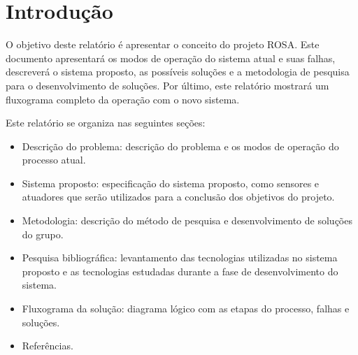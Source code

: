 


\section{Introdução}
O objetivo deste relatório é apresentar o conceito do projeto ROSA. Este
documento apresentará os modos de operação do sistema atual e suas falhas,
descreverá o sistema proposto, as possíveis soluções e a metodologia de pesquisa
para o desenvolvimento de soluções. Por último, este relatório mostrará um
fluxograma completo da operação com o novo sistema.

Este relatório se organiza nas seguintes seções:
    \begin{itemize}
        \item Descrição do problema: descrição do problema e os modos de operação do processo atual.
        \item Sistema proposto: especificação do sistema proposto, como sensores e atuadores que serão utilizados para a conclusão dos objetivos do projeto.
        \item Metodologia: descrição do método de pesquisa e desenvolvimento de soluções do grupo.
        \item Pesquisa bibliográfica: levantamento das tecnologias utilizadas no sistema proposto e as tecnologias estudadas durante a fase de desenvolvimento do sistema.
        \item Fluxograma da solução: diagrama lógico com as etapas do processo, falhas e soluções.
        \item Referências.
    \end{itemize}